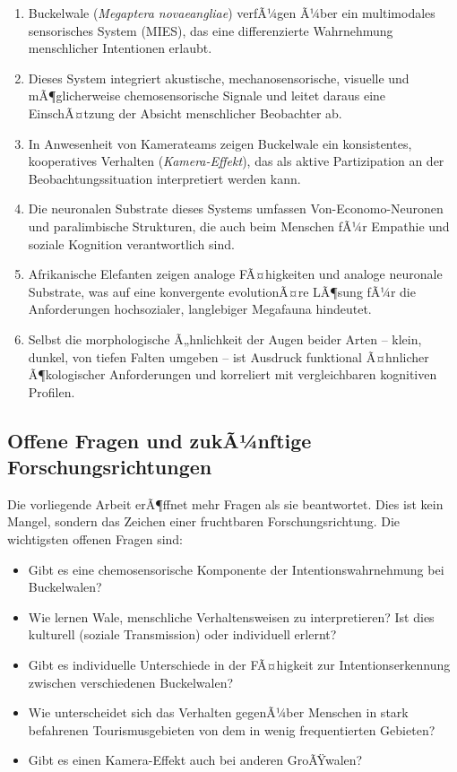 ﻿\documentclass[12pt,a4paper]{article}
\theoremstyle{definition}
\theoremstyle{remark}
\begin{document}
\begin{enumerate}
  \item Buckelwale (\textit{Megaptera novaeangliae}) verfÃ¼gen Ã¼ber ein
        multimodales sensorisches System (MIES), das eine differenzierte
        Wahrnehmung menschlicher Intentionen erlaubt.

  \item Dieses System integriert akustische, mechanosensorische, visuelle
        und mÃ¶glicherweise chemosensorische Signale und leitet daraus eine
        EinschÃ¤tzung der Absicht menschlicher Beobachter ab.

  \item In Anwesenheit von Kamerateams zeigen Buckelwale ein konsistentes,
        kooperatives Verhalten (\emph{Kamera-Effekt}), das als aktive
        Partizipation an der Beobachtungssituation interpretiert werden kann.

  \item Die neuronalen Substrate dieses Systems umfassen Von-Economo-Neuronen
        und paralimbische Strukturen, die auch beim Menschen fÃ¼r Empathie und
        soziale Kognition verantwortlich sind.

  \item Afrikanische Elefanten zeigen analoge FÃ¤higkeiten und analoge
        neuronale Substrate, was auf eine konvergente evolutionÃ¤re LÃ¶sung
        fÃ¼r die Anforderungen hochsozialer, langlebiger Megafauna hindeutet.

  \item Selbst die morphologische Ã„hnlichkeit der Augen beider Arten --
        klein, dunkel, von tiefen Falten umgeben -- ist Ausdruck
        funktional Ã¤hnlicher Ã¶kologischer Anforderungen und korreliert
        mit vergleichbaren kognitiven Profilen.
\end{enumerate}

\subsection{Offene Fragen und zukÃ¼nftige Forschungsrichtungen}

Die vorliegende Arbeit erÃ¶ffnet mehr Fragen als sie beantwortet. Dies ist
kein Mangel, sondern das Zeichen einer fruchtbaren Forschungsrichtung.
Die wichtigsten offenen Fragen sind:

\begin{itemize}
  \item Gibt es eine chemosensorische Komponente der Intentionswahrnehmung
        bei Buckelwalen?
  \item Wie lernen Wale, menschliche Verhaltensweisen zu interpretieren?
        Ist dies kulturell (soziale Transmission) oder individuell erlernt?
  \item Gibt es individuelle Unterschiede in der FÃ¤higkeit zur Intentionserkennung
        zwischen verschiedenen Buckelwalen?
  \item Wie unterscheidet sich das Verhalten gegenÃ¼ber Menschen in stark
        befahrenen Tourismusgebieten von dem in wenig frequentierten Gebieten?
  \item Gibt es einen Kamera-Effekt auch bei anderen GroÃŸwalen?
\end{itemize}
\end{document}
